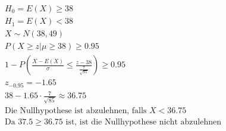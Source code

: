 \begin{align*}
    H_0 = E(X) \geq 38                                                                          \\
    H_1 = E(X) < 38                                                                             \\
    X \sim N(38, 49)                                                                            \\
    P(X \geq z | \mu \geq 38) \geq 0.95                                                         \\
    1 - P\left(\frac{X - E(X)}{\sigma} \leq \frac{z - 38}{\frac{7}{\sqrt{85}}}\right) \geq 0.95 \\
    z_{-0.95} = -1.65                                                                           \\
    38 - 1.65 \cdot \frac{7}{\sqrt{85}} \approx 36.75                                           \\
    \text{Die Nullhypothese ist abzulehnen, falls } X < 36.75                                   \\
    \text{Da } 37.5 \geq 36.75 \text{ ist, ist die Nullhypothese nicht abzulehnen}
\end{align*}